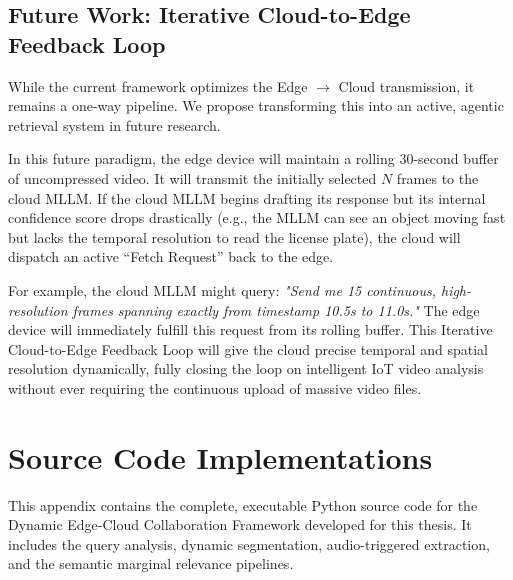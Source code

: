 \documentclass[12pt, a4paper]{report}
\begin{document}
\section{Future Work: Iterative Cloud-to-Edge Feedback Loop}
While the current framework optimizes the Edge $\rightarrow$ Cloud transmission, it remains a one-way pipeline. We propose transforming this into an active, agentic retrieval system in future research.

In this future paradigm, the edge device will maintain a rolling 30-second buffer of uncompressed video. It will transmit the initially selected $N$ frames to the cloud MLLM. If the cloud MLLM begins drafting its response but its internal confidence score drops drastically (e.g., the MLLM can see an object moving fast but lacks the temporal resolution to read the license plate), the cloud will dispatch an active ``Fetch Request'' back to the edge.

For example, the cloud MLLM might query: \textit{"Send me 15 continuous, high-resolution frames spanning exactly from timestamp 10.5s to 11.0s."} The edge device will immediately fulfill this request from its rolling buffer. This Iterative Cloud-to-Edge Feedback Loop will give the cloud precise temporal and spatial resolution dynamically, fully closing the loop on intelligent IoT video analysis without ever requiring the continuous upload of massive video files.

\appendix
\chapter{Source Code Implementations}
This appendix contains the complete, executable Python source code for the Dynamic Edge-Cloud Collaboration Framework developed for this thesis. It includes the query analysis, dynamic segmentation, audio-triggered extraction, and the semantic marginal relevance pipelines.\newline
\end{document}
